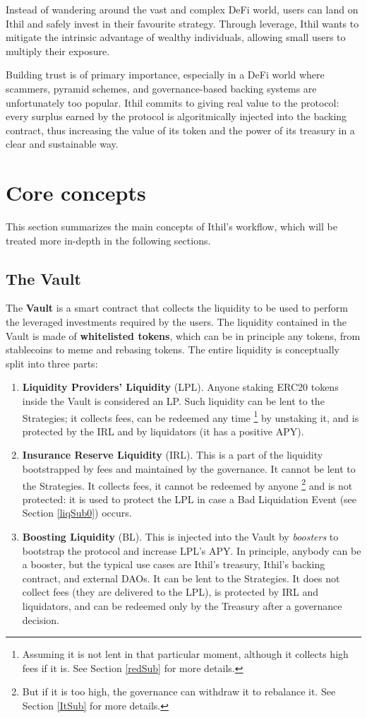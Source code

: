 \documentclass[a4paper,10 pt]{article}
\theoremstyle{definition}
\begin{document}
Instead of wandering around the vast and complex DeFi world, users can land on Ithil and safely invest in their favourite strategy. Through leverage, Ithil wants to mitigate the intrinsic advantage of wealthy individuals, allowing small users to multiply their exposure.

Building trust is of primary importance, especially in a DeFi world where scammers, pyramid schemes, and governance-based backing systems are unfortunately too popular. Ithil commits to giving real value to the protocol: every surplus earned by the protocol is algoritmically injected into the backing contract, thus increasing the value of its token and the power of its treasury in a clear and sustainable way.

\newpage
\section{Core concepts}\label{coreSec}
This section summarizes the main concepts of Ithil's workflow, which will be treated more in-depth in the following sections. 
\subsection{The Vault}\label{vaultSub}
The {\bf Vault} is a smart contract that collects the liquidity to be used to perform the leveraged investments required by the users. The liquidity contained in the Vault is made of {\bf whitelisted tokens}, which can be in principle any tokens, from stablecoins to meme and rebasing tokens. The entire liquidity is conceptually split into three parts:
\begin{enumerate}
\item {\bf Liquidity Providers' Liquidity} (LPL). Anyone staking ERC20 tokens inside the Vault is considered an LP. Such liquidity can be lent to the Strategies; it collects fees, can be redeemed any time \footnote{Assuming it is not lent in that particular moment, although it collects high fees if it is. See Section \ref{redSub} for more details.} by unstaking it, and is protected by the IRL and by liquidators (it has a positive APY).
\item {\bf Insurance Reserve Liquidity} (IRL). This is a part of the liquidity bootstrapped by fees and maintained by the governance. It cannot be lent to the Strategies. It collects fees, it cannot be redeemed by anyone \footnote{But if it is too high, the governance can withdraw it to rebalance it. See Section \ref{ItSub} for more details.} and is not protected: it is used to protect the LPL in case a Bad Liquidation Event (see Section \ref{liqSub0}) occurs.
\item {\bf Boosting Liquidity} (BL). This is injected into the Vault by {\it boosters} to bootstrap the protocol and increase LPL's APY. In principle, anybody can be a booster, but the typical use cases are Ithil's treasury, Ithil's backing contract, and external DAOs. It can be lent to the Strategies. It does not collect fees (they are delivered to the LPL), is protected by IRL and liquidators, and can be redeemed only by the Treasury after a governance decision.
\end{enumerate}
\end{document}
